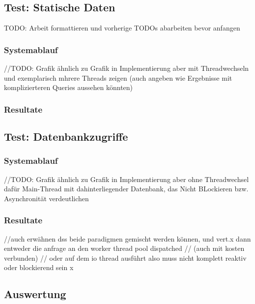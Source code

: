 \subsection{Test: Statische Daten}
\label{section:statische_daten}
TODO: Arbeit formattieren und vorherige TODOs abarbeiten bevor anfangen
\subsubsection{Systemablauf}
//TODO: Grafik ähnlich zu Grafik in Implementierung aber mit Threadwechseln und exemplarisch mhrere Threads zeigen
(auch angeben wie Ergebnisse mit komplizierteren Queries aussehen könnten)
\subsubsection{Resultate}

\subsection{Test: Datenbankzugriffe}
\label{section:datenbankzugriffe}

\subsubsection{Systemablauf}
//TODO: Grafik ähnlich zu Grafik in Implementierung aber ohne Threadwechsel dafür Main-Thread mit dahinterliegender Datenbank,
das Nicht BLockieren bzw. Asynchronität verdeutlichen

\subsubsection{Resultate}

//auch erwähnen dss beide paradigmen gemischt werden können, und vert.x dann entweder die anfrage an den worker thread pool dispatched
// (auch mit kosten verbunden)
// oder auf dem io thread ausführt also muss nicht komplett reaktiv oder blockierend sein x
\subsection{Auswertung}

\label{section:auswertung}